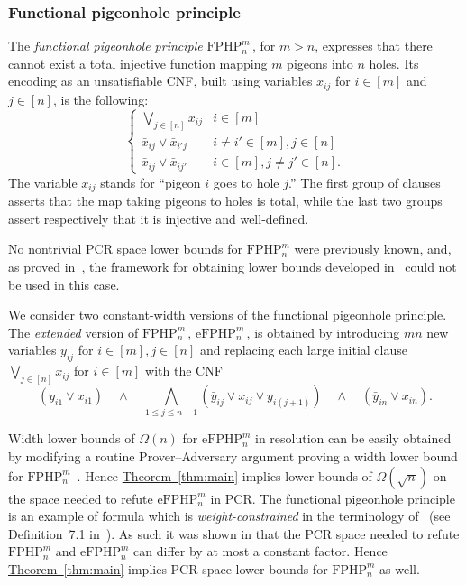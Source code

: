 \documentclass[11pt]{article}
\numberwithin{equation}{section}
\theoremstyle{definition}
\theoremstyle{plain}
\newcommand{\expref}[2]{\hyperref[#2]{#1~\ref{#2}}}
\newcommand\FPHP{\mathrm{FPHP}}
\newcommand\eFPHP{\mathrm{eFPHP}}
\begin{document}
\subsubsection{Functional pigeonhole principle}
The \emph{functional pigeonhole principle} $\FPHP^m_n$\,, for $m > n$, 
expresses that there cannot exist a total injective function mapping $m$ pigeons into $n$ holes. 
Its encoding as an unsatisfiable CNF, built using variables $x_{ij}$ for $i\in[m]$ and $j\in [n]$, is the following:
$$
\left \{
\begin{array}{ll}
\bigvee_{j\in[n]}x_{ij}  & i \in [m]   \\
\bar x_{ij} \vee \bar x_{i'j}  & i \not = i' \in [m],  j\in[n] \\
\bar x_{ij} \vee \bar x_{ij'}& i \in [m],  j \not = j'\in[n].
\end{array}
\right.
$$
The variable $x_{ij}$ stands for ``pigeon $i$ goes to hole $j$.''
The first group of clauses
asserts that the map taking pigeons to holes is total, 
while the last two groups assert
respectively that it is injective and well-defined.%

No nontrivial PCR 
space lower bounds for $\FPHP^m_n$ were previously known,  
and, as proved in~\cite{DBLP:conf/icalp/FilmusLMNV13},
the framework for obtaining lower bounds developed in~\cite{DBLP:journals/jacm/BonacinaG15} could not be used in this case.

We consider two constant-width versions of the functional pigeonhole principle. 
The \emph{extended} version of $\FPHP^m_n$\,, 
$\eFPHP^m_n$\,, is obtained by 
introducing $mn$ new variables  $y_{ij}$ for $i\in[m], j\in[n]$
and
replacing each large initial clause $\bigvee_{j\in[n]}x_{ij}$  for \mbox{$i \in [m]$}
with the CNF
\[
(y_{i1} \vee x_{i1})
\quad \wedge \quad
\bigwedge_{1 \leq  j \leq n-1} (\bar y_{ij} \vee x_{ij} \vee y_{i(j+1)})  
\quad \wedge \quad
 (\bar y_{in} \vee x_{in}).
\]

Width lower bounds of $\Omega(n)$ for  $\eFPHP^m_n$ in resolution can be easily obtained by modifying a routine Prover--Adversary argument
proving a width lower bound for $\FPHP^m_n$~\cite{DBLP:journals/jcss/AtseriasD08}.
Hence \expref{Theorem}{thm:main} implies lower bounds of $\Omega(\sqrt{n})$ 
on the space needed to refute $\eFPHP^m_n$ in PCR.  
The functional pigeonhole principle is an example of formula which is 
 \emph{weight-constrained} in the terminology of~\cite{DBLP:journals/siamcomp/FilmusLNRT15} 
 (see Definition~7.1 in~\cite{DBLP:journals/siamcomp/FilmusLNRT15}).
As such it was shown in \cite[Theorem 1.5]{DBLP:journals/siamcomp/FilmusLNRT15}
that the PCR space needed to refute $\FPHP^m_n$ and $\eFPHP^m_n$ can differ by at most a constant factor. 
Hence \expref{Theorem}{thm:main} implies PCR space lower bounds for $\FPHP^m_n$ as well.
\end{document}
